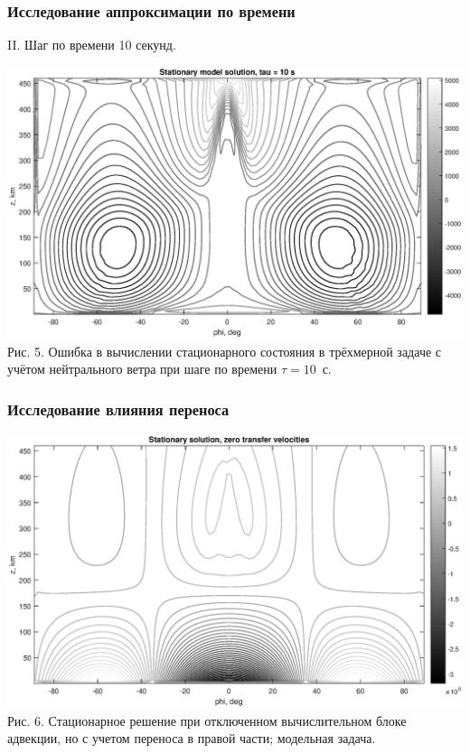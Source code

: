 \documentclass[9pt, apectratio=43,unicode]{beamer}
\begin{document}
\begin{frame}\frametitle{Исследование аппроксимации по времени}
II. Шаг по времени 10 секунд.

\begin{center}
\includegraphics[scale=0.45]{10sec}\\Рис. 5. Ошибка в вычислении стационарного состояния в трёхмерной задаче с учётом нейтрального ветра при шаге по времени $\tau = 10$~с.
\end{center}
\end{frame}



\begin{frame}\frametitle{Исследование влияния переноса}

\begin{center}
\includegraphics[scale=0.45]{no_transf}\\Рис. 6. Стационарное решение при отключенном вычислительном блоке адвекции, но с учетом переноса в правой части; модельная задача.
\end{center}
\end{frame}
\end{document}
